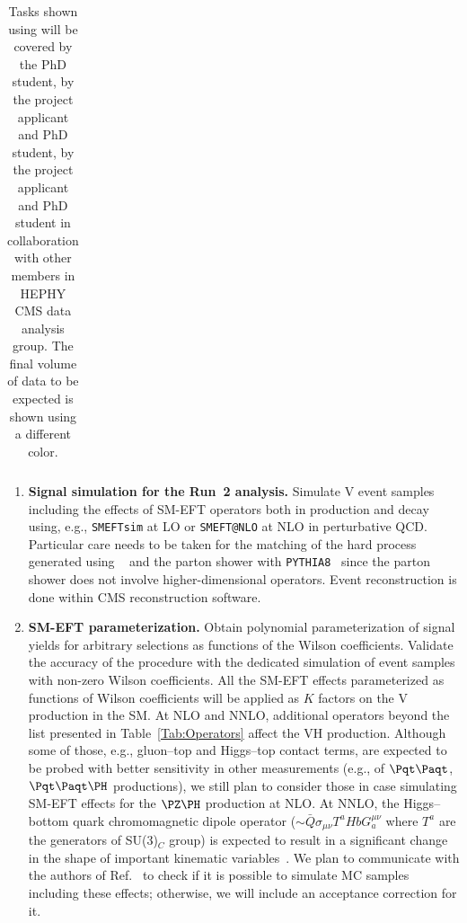 \documentclass[a4paper,11pt]{article}
\newcommand{\Pt}{{{\Pqt}}\xspace}
\newcommand{\PAt}{{{{\Paqt}}}\xspace}
\def\strut{\relax\ifmmode\copy\strutbox\else\unhcopy\strutbox\fi}
\renewcommand{\PV}{{{{V}}}\xspace}
\newcommand{\VH}{{{\PV}{\PH}}\xspace}
\begin{document}
\begin{table}
\begin{tabular}{l|m{0.9cm}|m{1.5cm}|m{0.9cm}|m{0.9cm}|m{0.9cm}|m{0.9cm}|m{0.9cm}|m{0.9cm}|m{0.9cm}|m{0.9cm}|m{0.9cm}|m{0.9cm}|m{0.9cm}|m{0.9cm}|m{0.9cm}|}
    \hline
  \end{tabular}
  \caption{
Tasks shown using \colorbox{gray}{ \makebox[0.01\textwidth][20cm]{\strut}} will be covered by the PhD student, \colorbox{green}{ \makebox[0.01\textwidth][20cm]{\strut}} by the project applicant and PhD student, \colorbox{orange}{ \makebox[0.01\textwidth][20cm]{\strut}} by the project applicant and PhD student in collaboration with other members in HEPHY CMS data analysis group. 
The final volume of data to be expected is shown using a different color. 
}
\label{tab:workplan}
\end{table}

\begin{enumerate}[noitemsep,topsep=0pt]
\item {\bf Signal simulation for the Run~2 analysis.} Simulate \VH event samples including the effects of SM-EFT operators both in production and decay using, e.g., \texttt{SMEFTsim} at LO or \texttt{SMEFT@NLO} at NLO in perturbative QCD. 
Particular care needs to be taken for the matching of the hard process generated using \texttt{\MGvATNLO}~\cite{Alwall:2014hca} and the parton shower with \texttt{PYTHIA8}~\cite{Sjostrand:2014zea} 
since the parton shower does not involve higher-dimensional operators. Event reconstruction is done within CMS reconstruction software.

\item {\bf SM-EFT parameterization.} Obtain polynomial parameterization of signal yields for arbitrary selections as functions of the Wilson coefficients. Validate the accuracy of the procedure with the dedicated simulation of event samples with non-zero Wilson coefficients.
All the SM-EFT effects parameterized as functions of Wilson coefficients will be applied as $K$ factors on the \VH production in the SM. 
At NLO and NNLO, additional operators beyond the list presented in Table~\ref{Tab:Operators} affect the VH production. Although some of those, e.g., gluon--top and Higgs--top contact terms, are expected to be probed with better sensitivity in other measurements (e.g., of $\Pt\PAt$, $\Pt\PAt\PH$ productions), we still plan to consider those in case simulating SM-EFT effects for the $\PZ\PH$ production at NLO. 
At NNLO, the Higgs--bottom quark chromomagnetic dipole operator ($\sim \bar{Q} {\sigma}_{\mu\nu} T^a H b G^{\mu\nu}_{a}$ where $T^a$ are the generators of SU(3)$_C$ group) is expected to result in a significant change in the shape of important kinematic variables~\cite{Haisch:2022nwz}. We plan to communicate with the authors of Ref.~\cite{Haisch:2022nwz} to check if it is possible to simulate MC samples including these effects; otherwise, we will include an acceptance correction for it.


\end{enumerate}
\end{document}
